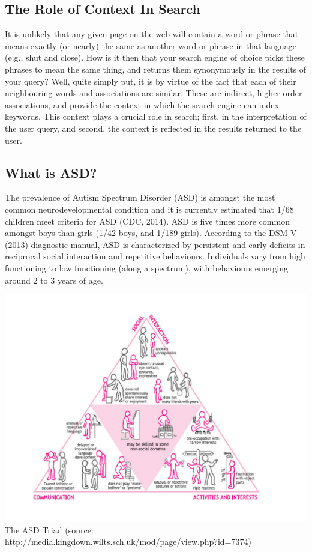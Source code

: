 \documentclass[10pt]{article}
\begin{document}
\subsection{The Role of Context In Search}
It is unlikely that any given page on the web will contain a word or phrase that means exactly (or nearly) the same as another word or phrase in that language (e.g., shut and close). How is it then that your search engine of choice picks these phrases to mean the same thing, and returns them synonymously in the results of your query? Well, quite simply put, it is by virtue of the fact that each of their neighbouring words and associations are similar. These are indirect, higher-order associations, and provide the context in which the search engine can index keywords. This context plays a crucial role in search; first, in the interpretation of the user query, and second, the context is reflected in the results returned to the user.

\subsection{What is ASD?}
The prevalence of Autism Spectrum Disorder (ASD) is amongst the most common neurodevelopmental condition and it is currently estimated that 1/68 children meet criteria for ASD (CDC, 2014). ASD is five times more common amongst boys than girls (1/42 boys, and 1/189 girls). According to the DSM-V (2013) diagnostic manual, ASD is characterized by persistent and early deficits in reciprocal social interaction and repetitive behaviours. Individuals vary from high functioning to low functioning (along a spectrum), with behaviours emerging around 2 to 3 years of age. 

\begin{center}
\includegraphics[scale=0.5]{asd}\\
The ASD Triad (source: http://media.kingdown.wilts.sch.uk/mod/page/view.php?id=7374)
\end{center}
\end{document}

